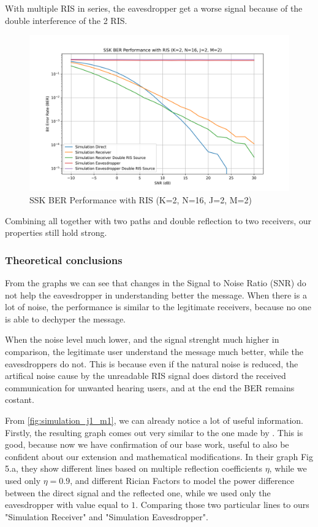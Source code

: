 With multiple RIS in series, the eavesdropper get a worse signal because of the double interference of the 2 RIS.

\begin{figure}[H]
  \centering
  \includegraphics[width=0.9\linewidth]{imgs/ber-simulations/SSK BER Performance with RIS (K=2, N=16, J=2, M=2).png}
  \caption{SSK BER Performance with RIS (K=2, N=16, J=2, M=2)}
  \label{fig:simulation_j2_m2}
\end{figure}

Combining all together with two paths and double reflection to two receivers, our properties still hold strong.

\subsubsection{Theoretical conclusions}

From the graphs we can see that changes in the Signal to Noise Ratio (SNR) do not help the eavesdropper in understanding better the message. When there is a lot of noise, the performance is similar to the legitimate receivers, because no one is able to dechyper the message.

When the noise level much lower, and the signal strenght much higher in comparison, the legitimate user understand the message much better, while the eavesdroppers do not. This is because even if the natural noise is reduced, the artifical noise cause by the unreadable RIS signal does distord the received communication for unwanted hearing users, and at the end the BER remains costant.

From \ref{fig:simulation_j1_m1}, we can already notice a lot of useful information. Firstly, the resulting graph comes out very similar to the one made by \cite{9328149}. This is good, because now we have confirmation of our base work, useful to also be confident about our extension and mathematical modifications. In their graph Fig 5.a, they show different lines based on multiple reflection coefficients $\eta$, while we used only $\eta = 0.9$, and different Rician Factors to model the power difference between the direct signal and the reflected one, while we used only the eavesdropper with value equal to $1$. Comparing those two particular lines to ours "Simulation Receiver" and "Simulation Eavesdropper".

